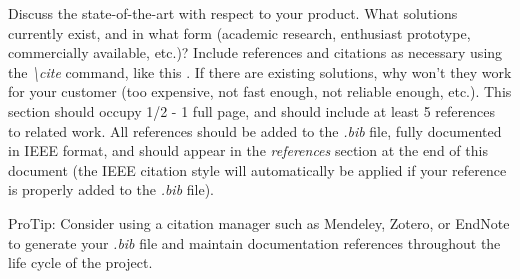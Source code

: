Discuss the state-of-the-art with respect to your product. What solutions currently exist, and in what form (academic research, enthusiast prototype, commercially available, etc.)? Include references and citations as necessary using the \textit{\textbackslash cite} command, like this \cite{Rubin2012}. If there are existing solutions, why won't they work for your customer (too expensive, not fast enough, not reliable enough, etc.). This section should occupy 1/2 - 1 full page, and should include at least 5 references to related work. All references should be added to the \textit{.bib} file, fully documented in IEEE format, and should appear in the \textit{references} section at the end of this document (the IEEE citation style will automatically be applied if your reference is properly added to the \textit{.bib} file).

ProTip: Consider using a citation manager such as Mendeley, Zotero, or EndNote to generate your \textit{.bib} file and maintain documentation references throughout the life cycle of the project.

